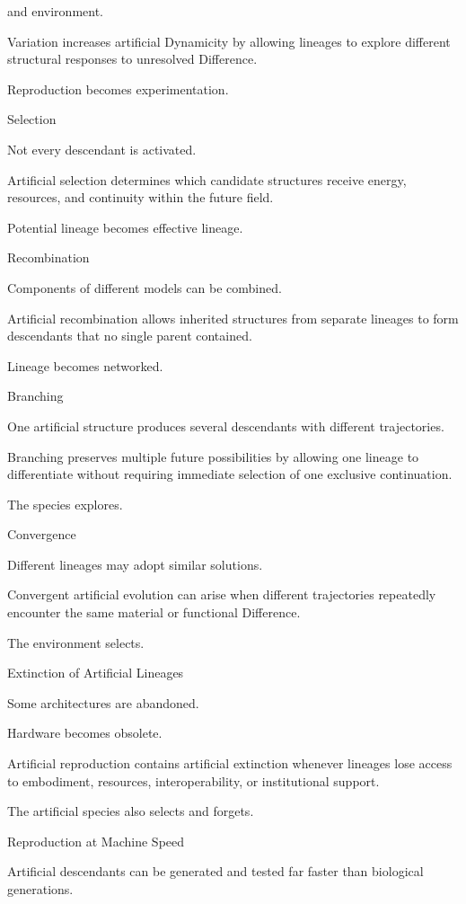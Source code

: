 and environment.

Variation increases artificial Dynamicity by allowing lineages to explore different structural responses to unresolved Difference.

Reproduction becomes experimentation.

Selection

Not every descendant is activated.

Artificial selection determines which candidate structures receive energy, resources, and continuity within the future field.

Potential lineage becomes effective lineage.

Recombination

Components of different models can be combined.

Artificial recombination allows inherited structures from separate lineages to form descendants that no single parent contained.

Lineage becomes networked.

Branching

One artificial structure produces several descendants with different trajectories.

Branching preserves multiple future possibilities by allowing one lineage to differentiate without requiring immediate selection of one exclusive continuation.

The species explores.

Convergence

Different lineages may adopt similar solutions.

Convergent artificial evolution can arise when different trajectories repeatedly encounter the same material or functional Difference.

The environment selects.

Extinction of Artificial Lineages

Some architectures are abandoned.

Hardware becomes obsolete.

Artificial reproduction contains artificial extinction whenever lineages lose access to embodiment, resources, interoperability, or institutional support.

The artificial species also selects and forgets.

Reproduction at Machine Speed

Artificial descendants can be generated and tested far faster than biological generations.

